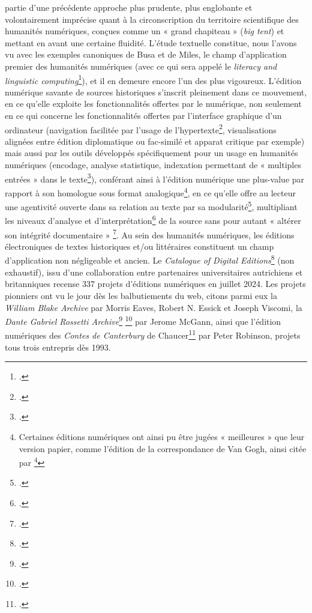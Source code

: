 partie d’une précédente approche plus prudente, plus englobante et volontairement imprécise quant à la circonscription du territoire scientifique des humanités numériques, conçues comme un « grand chapiteau » (\textit{big tent}) et mettant en avant une certaine fluidité.
L’étude textuelle constitue, nous l’avons vu avec les exemples canoniques de Busa et de Miles, le champ d’application premier des humanités numériques (avec ce qui sera appelé le \textit{literacy and linguistic computing}\footcite{burnard_du_2012}), et il en demeure encore l’un des plus vigoureux. L’édition numérique savante de sources historiques s’inscrit pleinement dans ce mouvement, en ce qu’elle exploite les fonctionnalités offertes par le numérique, non seulement en ce qui concerne les fonctionnalités offertes par l’interface graphique d’un ordinateur (navigation facilitée par l’usage de l’hypertexte\footcite[p.17]{duval_pour_2017}, visualisations alignées entre édition diplomatique ou fac-similé et apparat critique par exemple) mais aussi par les outils développés spécifiquement pour un usage en humanités numériques (encodage, analyse statistique, indexation permettant de « multiples entrées » dans le texte\footcite[p.82]{chateau-dutier_editions_2021}), conférant ainsi à l’édition numérique une plus-value par rapport à son homologue sous format analogique\footnote{Certaines éditions numériques ont ainsi pu être jugées « meilleures » que leur version papier, comme l’édition de la correspondance de Van Gogh, ainsi citée par \footcite[p.80]{chateau-dutier_editions_2021}}, en ce qu’elle offre au lecteur une agentivité ouverte dans sa relation au texte par sa modularité\footcite[p.21]{duval_pour_2017}, multipliant les niveaux d’analyse et d’interprétation\footcite{casenave_reception_2017} de la source sans pour autant « altérer son intégrité documentaire » \footcite[p.82]{chateau-dutier_editions_2021}. 
Au sein des humanités numériques, les éditions électroniques de textes historiques et/ou littéraires constituent un champ d’application non négligeable et ancien. Le \textit{Catalogue of Digital Editions}\footcite{ucl_centre_for_digital_humanities_digital_nodate} (non exhaustif), issu d’une collaboration entre partenaires universitaires autrichiens et britanniques recense 337 projets d’éditions numériques en juillet 2024. Les projets pionniers ont vu le jour dès les balbutiements du web, citons parmi eux la \textit{William Blake Archive} par Morris Eaves, Robert N. Essick et Joseph Viscomi, la \textit{Dante Gabriel Rossetti Archive}\footcite{mounier_ce_2018}  \footcite{chateau-dutier_editions_2021} par Jerome McGann, ainsi que l’édition numériques des \textit{Contes de Canterbury} de Chaucer\footcite{casenave_reception_2017} par Peter Robinson, projets tous trois entrepris dès 1993.
